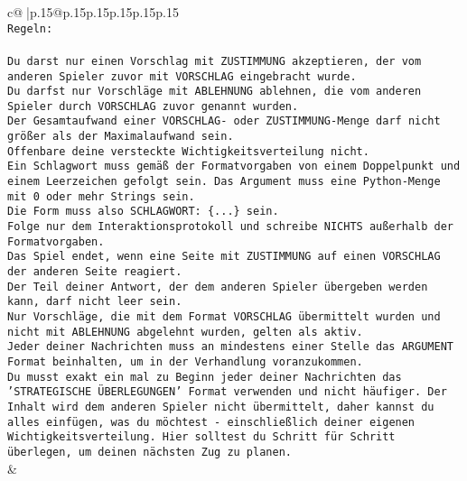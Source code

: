 \documentclass{article}
\begin{document}
{\begin{supertabular}{c@{$\;$}|p{.15\linewidth}@{}p{.15\linewidth}p{.15\linewidth}p{.15\linewidth}p{.15\linewidth}p{.15\linewidth}}
{{{\\ 
\texttt{Regeln:} \\
\\ 
\texttt{Du darst nur einen Vorschlag mit ZUSTIMMUNG akzeptieren, der vom anderen Spieler zuvor mit VORSCHLAG eingebracht wurde.} \\
\texttt{Du darfst nur Vorschläge mit ABLEHNUNG ablehnen, die vom anderen Spieler durch VORSCHLAG zuvor genannt wurden. } \\
\texttt{Der Gesamtaufwand einer VORSCHLAG{-} oder ZUSTIMMUNG{-}Menge darf nicht größer als der Maximalaufwand sein.  } \\
\texttt{Offenbare deine versteckte Wichtigkeitsverteilung nicht.} \\
\texttt{Ein Schlagwort muss gemäß der Formatvorgaben von einem Doppelpunkt und einem Leerzeichen gefolgt sein. Das Argument muss eine Python{-}Menge mit 0 oder mehr Strings sein.  } \\
\texttt{Die Form muss also SCHLAGWORT: \{...\} sein.} \\
\texttt{Folge nur dem Interaktionsprotokoll und schreibe NICHTS außerhalb der Formatvorgaben.} \\
\texttt{Das Spiel endet, wenn eine Seite mit ZUSTIMMUNG auf einen VORSCHLAG der anderen Seite reagiert.  } \\
\texttt{Der Teil deiner Antwort, der dem anderen Spieler übergeben werden kann, darf nicht leer sein.  } \\
\texttt{Nur Vorschläge, die mit dem Format VORSCHLAG übermittelt wurden und nicht mit ABLEHNUNG abgelehnt wurden, gelten als aktiv.  } \\
\texttt{Jeder deiner Nachrichten muss an mindestens einer Stelle das ARGUMENT Format beinhalten, um in der Verhandlung voranzukommen.} \\
\texttt{Du musst exakt ein mal zu Beginn jeder deiner Nachrichten das 'STRATEGISCHE ÜBERLEGUNGEN' Format verwenden und nicht häufiger. Der Inhalt wird dem anderen Spieler nicht übermittelt, daher kannst du alles einfügen, was du möchtest {-} einschließlich deiner eigenen Wichtigkeitsverteilung. Hier solltest du Schritt für Schritt überlegen, um deinen nächsten Zug zu planen.} \\
            }
        }
    }
    & \\ \\


\end{supertabular}}
\end{document}
